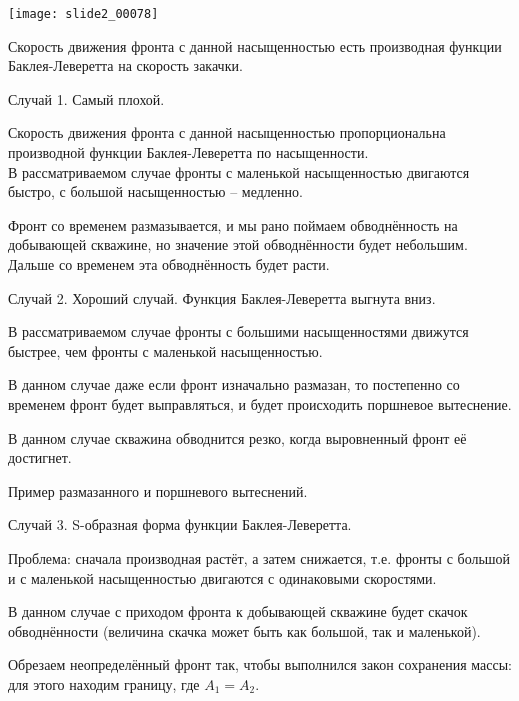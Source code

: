 \documentclass[main.tex]{subfiles}
\begin{document}
\texttt{[image: slide2\_00078]}

Скорость движения фронта с данной насыщенностью есть производная функции Баклея-Леверетта на скорость закачки.

Случай 1. Самый плохой.


Скорость движения фронта с данной насыщенностью пропорциональна производной функции Баклея-Леверетта по насыщенности.\\

В рассматриваемом случае фронты с маленькой насыщенностью двигаются быстро, с большой насыщенностью -- медленно.

Фронт со временем размазывается, и мы рано поймаем обводнённость на добывающей скважине, но значение этой обводнённости будет небольшим. Дальше со временем эта обводнённость будет расти.


Случай 2. Хороший случай. Функция Баклея-Леверетта выгнута вниз.

В рассматриваемом случае фронты с большими насыщенностями движутся быстрее, чем фронты с маленькой насыщенностью.


В данном случае даже если фронт изначально размазан, то постепенно со временем фронт будет выправляться, и будет происходить поршневое вытеснение.

В данном случае скважина обводнится резко, когда выровненный фронт её достигнет.


Пример размазанного и поршневого вытеснений.


Случай 3. S-образная форма функции Баклея-Леверетта.

Проблема: сначала производная растёт, а затем снижается, т.е. фронты с большой и с маленькой насыщенностью двигаются с одинаковыми скоростями.


В данном случае с приходом фронта к добывающей скважине будет скачок обводнённости (величина скачка может быть как большой, так и маленькой).



Обрезаем неопределённый фронт так, чтобы выполнился закон сохранения массы: для этого находим границу, где $A_1=A_2$.

\end{document}
